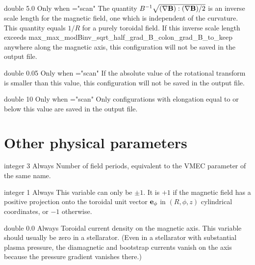 \myhrule

{double}
{5.0}
{Only when ={\ttfamily "scan"}}
{The quantity $B^{-1}\sqrt{(\nabla {\mathbf B}):(\nabla{\mathbf B})/2}$ is an inverse scale length
for the magnetic field, one which is independent of the curvature. This quantity equals $1/R$ for a purely toroidal field.
If this inverse scale length exceeds {\ttfamily max\_max\_modBinv\_sqrt\_half\_grad\_B\_colon\_grad\_B\_to\_keep}
anywhere along the magnetic axis, this configuration will not be saved in the output file.
}

\myhrule

{double}
{0.05}
{Only when ={\ttfamily "scan"}}
{If the absolute value of the rotational transform is smaller than this value, this configuration will not be saved in the output file.
}

\myhrule

{double}
{10}
{Only when ={\ttfamily "scan"}}
{Only configurations with elongation equal to or below this value are saved in the output file.}

\myhrule



\section{Other physical parameters}

{integer}
{3}
{Always}
{Number of field periods, equivalent to the VMEC parameter of the same name.}

\myhrule

{integer}
{1}
{Always}
{This variable can only be $\pm 1$. It is $+1$ if the magnetic field has a positive projection onto the toroidal unit vector ${\mathbf e}_\phi$
in $(R,\phi,z)$ cylindrical coordinates, or $-1$ otherwise.}

\myhrule

{double}
{0.0}
{Always}
{Toroidal current density on the magnetic axis. This variable should usually be zero in a stellarator.  (Even in a stellarator with substantial plasma pressure, the diamagnetic and bootstrap currents vanish on the axis because the pressure gradient vanishes there.)}

